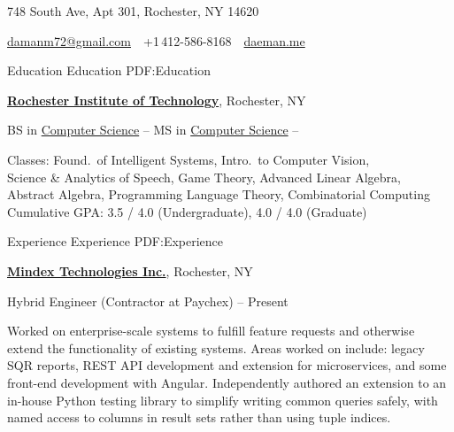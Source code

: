 \documentclass[letterpaper,MMMyyyy,nonstopmode]{simpleresumecv}
\newcommand{\CVAuthor}{Daman Morris}
\newcommand{\CVWebpage}{daeman.me}
\begin{document}

\Title{\CVAuthor}

\begin{SubTitle}
748 South Ave, Apt 301, Rochester, NY 14620
\par
\href{mailto:damanm72@gmail.com}
{damanm72@gmail.com}
\,\SubBulletSymbol\,
+1\,412-586-8168
\,\SubBulletSymbol\,
\href{\CVWebpage}
{\url{\CVWebpage}}
\end{SubTitle}

\begin{Body}


\Section
{Education}
{Education}
{PDF:Education}

\Entry
\href{http://www.rit.edu}
{\textbf{Rochester Institute of Technology}},
Rochester, NY

\Gap
\BulletItem
BS in
\href{http://cs.rit.edu}
{Computer Science}
\hfill
{} --
\BulletItem
MS in
\href{http://cs.rit.edu}
{Computer Science}
\hfill
{} --
\begin{Detail}
\SubBulletItem
Classes:
Found.\ of Intelligent Systems, Intro.\ to Computer Vision, \\
Science \& Analytics of Speech, Game Theory, Advanced Linear Algebra, \\
Abstract Algebra, Programming Language Theory, Combinatorial Computing
\SubBulletItem
Cumulative GPA: 3.5 / 4.0 (Undergraduate), 4.0 / 4.0 (Graduate)
\end{Detail}


\Section
{Experience}
{Experience}
{PDF:Experience}

\Entry
\href{http://www.mindex.com}
{\textbf{Mindex Technologies Inc.}},
Rochester, NY

\Gap
\BulletItem
Hybrid Engineer (Contractor at Paychex)
\hfill
{} --
Present
\begin{Detail}
    \SubBulletItem
    Worked on enterprise-scale systems to fulfill feature requests and
    otherwise extend the functionality of existing systems. Areas worked on
    include: legacy SQR reports, REST API development and extension for
    microservices, and some front-end development with Angular.
    \SubBulletItem
    Independently authored an extension to an in-house Python testing library
    to simplify writing common queries safely, with named access to columns
    in result sets rather than using tuple indices.
\end{Detail}


\end{Body}
\end{document}
